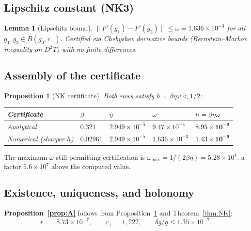 \documentclass[11pt,a4paper]{article}
\newtheorem{proposition}[theorem]{Proposition}
\newtheorem{lemma}[theorem]{Lemma}
\theoremstyle{definition}
\theoremstyle{remark}
\begin{document}
\subsection{Lipschitz constant (NK3)}

\begin{lemma}[Lipschitz bound]\label{lem:omega}
$\|F'(g_1) - F'(g_2)\| \leq \omega = 1.636 \times 10^{-3}$ for all $g_1, g_2 \in B(g_0, r_+)$. Certified via Chebyshev derivative bounds (Bernstein--Markov inequality on $D^2T$) with no finite differences.
\end{lemma}

\subsection{Assembly of the certificate}

\begin{proposition}[NK certificate]\label{prop:nkcert}
Both rows satisfy $h = \beta\eta\omega < 1/2$:
\begin{center}
\begin{tabular}{lllll}
\toprule
Certificate & $\beta$ & $\eta$ & $\omega$ & $h = \beta\eta\omega$ \\
\midrule
Analytical & $0.321$ & $2.949 \times 10^{-5}$ & $9.47 \times 10^{-4}$ & $\mathbf{8.95 \times 10^{-9}}$ \\
Numerical (sharper $h$) & $0.02961$ & $2.949 \times 10^{-5}$ & $1.636 \times 10^{-3}$ & $\mathbf{1.43 \times 10^{-9}}$ \\
\bottomrule
\end{tabular}
\end{center}
\end{proposition}

The maximum $\omega$ still permitting certification is $\omega_{\max} = 1/(2\beta\eta) = 5.28 \times 10^4$, a factor $5.6 \times 10^7$ above the computed value.

\subsection{Existence, uniqueness, and holonomy}\label{sec:holonomy}

\textbf{Proposition~\ref{prop:A}} follows from Proposition~\ref{prop:nkcert} and Theorem~\ref{thm:NK}:
\begin{equation}
r_- = 8.73 \times 10^{-7}, \qquad r_+ = 1{,}222, \qquad \delta g/g \leq 1.35 \times 10^{-7}.
\end{equation}
\end{document}
